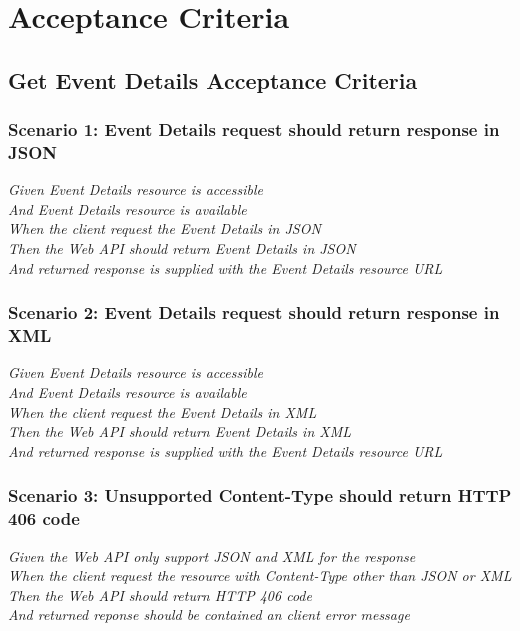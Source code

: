 \documentclass[a4paper, 12pt, oneside]{report}
\begin{document}
\appendix
\chapter{Acceptance Criteria} \label{lampiran-acceptance-criteria}
\section{Get Event Details Acceptance Criteria}
\subsection{Scenario 1: Event Details request should return response in JSON}

\onehalfspacing \textit{Given Event Details resource is accessible\\
And Event Details resource is available\\
When the client request the Event Details in JSON\\
Then the Web API should return Event Details in JSON\\
And returned response is supplied with the Event Details resource URL\\}

\subsection{Scenario 2: Event Details request should return response in XML}

\onehalfspacing \textit{Given Event Details resource is accessible\\
And Event Details resource is available\\
When the client request the Event Details in XML\\
Then the Web API should return Event Details in XML\\
And returned response is supplied with the Event Details resource URL\\}

\subsection{Scenario 3: Unsupported Content-Type should return HTTP 406 code}

\onehalfspacing \textit{Given the Web API only support JSON and XML for the response\\
When the client request the resource with Content-Type other than JSON or XML\\
Then the Web API should return HTTP 406 code\\
And returned reponse should be contained an client error message}
\end{document}
